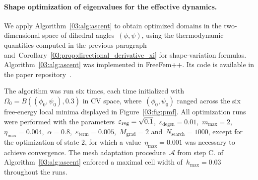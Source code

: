 \paragraph{Shape optimization of eigenvalues for the effective dynamics.}
We apply Algorithm~\ref{03:alg:ascent} to obtain optimized domains in the two-dimensional space of dihedral angles~$(\phi,\psi)$, using the thermodynamic quantities computed in the previous paragraph and~Corollary~\ref{03:prop:directional_derivative_xi} for shape-variation formulas.
Algorithm~\ref{03:alg:ascent} was implemented in FreeFem++. Its code is available in the paper repository~\cite{github}.

The algorithm was run six times, each time initialized with~$\Omega_0 = B\left((\phi_0,\psi_0),0.3\right)$ in CV space, where~$(\phi_0,\psi_0)$ ranged across the six free-energy local minima displayed in Figure~\ref{03:fig:pmf}. All optimization runs were performed with the parameters~$\varepsilon_{\mathrm{reg}}=\sqrt{0.1}$,~$\varepsilon_{\mathrm{degen}}=0.01$,~$m_{\max}=2$,~$\eta_{\max}=0.004$,~$\alpha=0.8$,~$\varepsilon_{\mathrm{term}}=0.005$,~$M_{\mathrm{grad}}=2$ and~$N_{\mathrm{search}}=1000$, except for the optimization of state 2, for which a value~$\eta_{\max}=0.001$ was necessary to achieve convergence.
The mesh adaptation procedure~$\mathcal A$ from step C. of Algorithm~\ref{03:alg:ascent} enforced a maximal cell width of~$h_{\max}=0.03$ throughout the runs.

